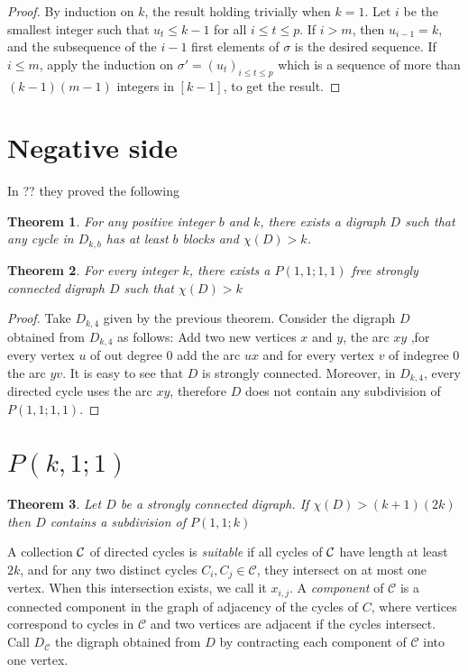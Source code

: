 \documentclass[utf8,11pt]{article}
\theoremstyle{plain}
\newtheorem{theorem}{Theorem}
\theoremstyle{definition}
\theoremstyle{remark}
\begin{document}
\begin{proof}
By induction on $k$, the result holding trivially when $k=1$. 
Let $i$ be the smallest integer such that $u_t\leq k-1$ for all $i\leq t\leq p$.
If $i>m$, then $u_{i-1}=k$, and the subsequence of the $i-1$ first elements of $\sigma$ is the desired sequence.
If $i\leq m$, apply the induction on $\sigma'=(u_t)_{i\leq t\leq p}$ which is a sequence of more than $(k-1)(m-1)$ integers in $[k-1]$, to get the result. 
\end{proof}




\section{Negative side}

In ?? they proved the following 
\begin{theorem}
For any positive integer $b$ and $k$, there exists a digraph $D$ such that any cycle in $D_{k,b}$ has at least $b$ blocks and $\chi(D) > k$.
\end{theorem}

\begin{theorem}
For every integer $k$, there exists a $P(1,1;1,1)$ free strongly connected digraph $D$ such that $\chi(D) >k$ 

\end{theorem}

\begin{proof}
Take $D_{k,4}$ given by the previous theorem. Consider the digraph $D$ obtained from $D_{k,4}$ as follows: Add two new vertices $x$ and $y$, the arc $xy$
,for every vertex $u$ of out degree $0$ add the arc $ux$ and for every vertex $v$ of indegree 0 the arc $yv$. It is easy to see that $D$ is strongly connected.
Moreover, in $D_{k,4}$, every directed cycle uses the arc $xy$, therefore $D$ does not contain any subdivision of $P(1,1;1,1)$. 
\end{proof}




\section{$P(k,1;1)$}

\begin{theorem}\label{th:P11k}
Let $D$ be a strongly connected digraph. If $\chi(D) >  (k+1) (2k)$ then $D$ contains a subdivision of $P(1,1;k)$
\end{theorem}

A collection ${\cal C}$ of directed cycles is {\it suitable} if all cycles of ${\cal C}$ have length at least $2k$, and for
any two distinct cycles $C_i,C_j\in\mathcal C$, they intersect on at most one vertex. When this intersection exists, we call it $x_{i,j}$.
A {\it component} of $\mathcal{C}$ is a connected component in the graph of adjacency of the cycles of $C$, where vertices correspond to cycles in $\mathcal{C}$
and two vertices are adjacent if the cycles intersect. 
Call $D_{\mathcal{C}}$ the digraph obtained from $D$ by contracting each component of $\mathcal{C}$ into one vertex. 
\end{document}
